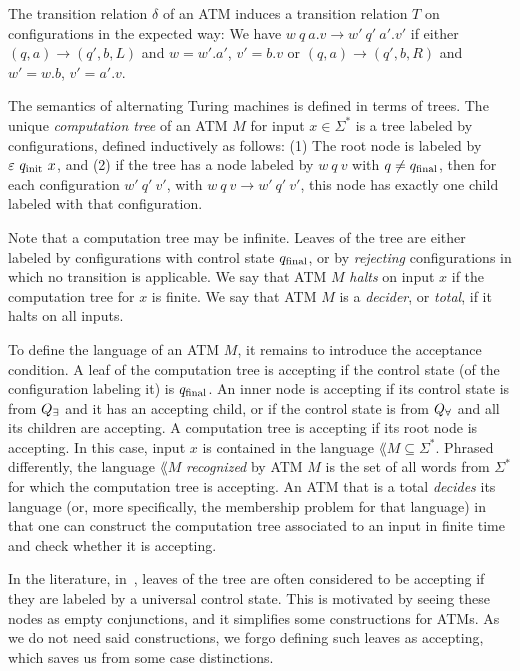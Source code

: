 \documentclass[../../diss.tex]{subfiles}
\begin{document}
The transition relation $\delta$ of an ATM induces a transition relation $T$ on configurations in the expected way:
We have $w \ q \ a.v \to w' \ q' \ a'.v'$ if either $(q,a) \to (q',b,L)$ and $w = w'.a'$, $v' = b.v$ or $(q,a) \to (q',b,R)$ and $w' = w.b$, $v' = a'.v$.

The semantics of alternating Turing machines is defined in terms of trees.
The unique \emph{computation tree} of an ATM $M$ for input $x \in \Sigma^*$ is a tree labeled by configurations, defined inductively as follows:
(1) The root node is labeled by $\eps \ q_\init \ x$, and
(2) if the tree has a node labeled by $w \ q \ v$ with $q \neq q_{\text{final}}$, then for each configuration $w' \ q' \ v'$, with $w \ q \ v \to w' \ q' \ v'$, this node has exactly one child labeled with that configuration.

Note that a computation tree may be infinite.
Leaves of the tree are either labeled by configurations with control state $q_{\text{final}}$, or by \emph{rejecting} configurations in which no transition is applicable.
We say that ATM $M$ \emph{halts} on input $x$ if the computation tree for $x$ is finite.
We say that ATM $M$ is a \emph{decider}, or \emph{total}, if it halts on all inputs.

To define the language of an ATM $M$, it remains to introduce the acceptance condition.
A leaf of the computation tree is accepting if the control state (of the configuration labeling it) is $q_{\text{final}}$.
An inner node is accepting if its control state is from $Q_\exists$ and it has an accepting child, or if the control state is from $Q_\forall$ and all its children are accepting.
A computation tree is accepting if its root node is accepting.
In this case, input $x$ is contained in the language $\lang{M} \subseteq \Sigma^*$.
Phrased differently, the language $\lang{M}$ \emph{recognized} by ATM $M$ is the set of all words from $\Sigma^*$ for which the computation tree is accepting.
An ATM that is a total \emph{decides} its language (or, more specifically, the membership problem for that language) in that one can construct the computation tree associated to an input in finite time and check whether it is accepting.

\begin{remark*}
    In the literature, \eg in~\cite{Kozen06}, leaves of the tree  are often considered to be accepting if they are labeled by a universal control state.
    This is motivated by seeing these nodes as empty conjunctions, and it simplifies some constructions for ATMs.
    As we do not need said constructions, we forgo defining such leaves as accepting, which saves us from some case distinctions.
\end{remark*}
\end{document}
